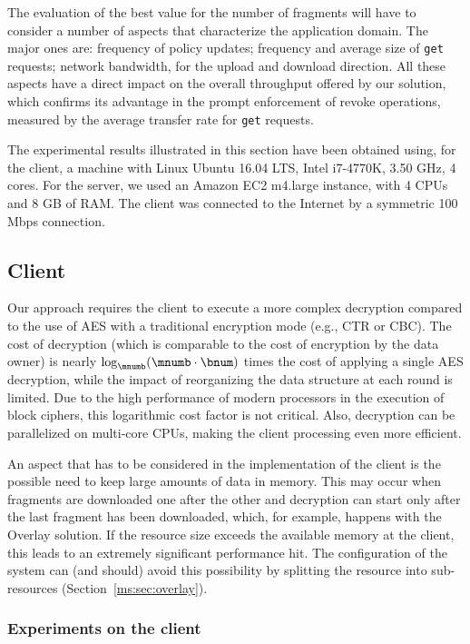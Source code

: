 The evaluation of the best value for the number of fragments will have to consider a number of aspects that characterize the application domain. The major ones are: frequency of policy updates; frequency and average size of {\tt get} requests; network bandwidth, for the upload and download direction. All these aspects have a direct impact on the overall throughput offered by our solution, which confirms its advantage in the prompt enforcement of revoke operations, measured by the average transfer rate for {\tt get} requests. 

The experimental results illustrated in this section have been obtained using, for the client, a machine with Linux Ubuntu 16.04 LTS, Intel i7-4770K, 3.50 GHz, 4 cores. For the server, we used an Amazon EC2 m4.large instance, with 4 CPUs and 8 GB of RAM. The client was connected to the Internet by a symmetric 100 Mbps connection.

\subsection{Client}\label{ms:sec:client}
Our approach requires the client to execute a more complex decryption compared to the use of AES with a traditional encryption mode (e.g., CTR or CBC). The cost of decryption (which is comparable to the cost of encryption by the data owner) is nearly $\log_{\mnumb} (\mnumb \cdot \bnum)$ times the cost of applying a single AES decryption, while the impact of reorganizing the data structure at each round is limited. Due to the high performance of modern processors in the execution of block ciphers, this logarithmic cost factor is not critical. Also, decryption can be parallelized on multi-core CPUs, making the client processing even more efficient.

An aspect that has to be considered in the implementation of the client is the possible need to keep large amounts of data in memory. This may occur when fragments are downloaded one after the other and decryption can start only after the last fragment has been downloaded, which, for example, happens with the Overlay solution. If the resource size exceeds the available memory at the client, this leads to an extremely significant performance hit. The configuration of the system can (and should) avoid this possibility by splitting the resource into sub-resources (Section~\ref{ms:sec:overlay}).

\subsubsection{Experiments on the client}
\label{ms:sect:experiments}

